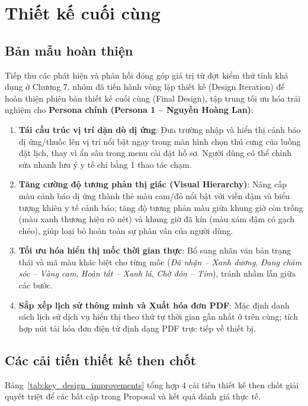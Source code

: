 \section{Thiết kế cuối cùng}

\subsection{Bản mẫu hoàn thiện}
Tiếp thu các phát hiện và phản hồi đóng góp giá trị từ đợt kiểm thử tính khả dụng ở Chương 7, nhóm đã tiến hành vòng lặp thiết kế (Design Iteration) để hoàn thiện phiên bản thiết kế cuối cùng (Final Design), tập trung tối ưu hóa trải nghiệm cho \textbf{Persona chính (Persona 1 -- Nguyễn Hoàng Lan)}:
\begin{enumerate}
    \item \textbf{Tái cấu trúc vị trí dặn dò dị ứng}: Đưa trường nhập và hiển thị cảnh báo dị ứng/thuốc lên vị trí nổi bật ngay trong màn hình chọn thú cưng của luồng đặt lịch, thay vì ẩn sâu trong menu cài đặt hồ sơ. Người dùng có thể chỉnh sửa nhanh lưu ý y tế chỉ bằng 1 thao tác chạm.
    \item \textbf{Tăng cường độ tương phản thị giác (Visual Hierarchy)}: Nâng cấp màu cảnh báo dị ứng thành thẻ màu cam/đỏ nổi bật với viền đậm và biểu tượng khiên y tế cảnh báo; tăng độ tương phản màu giữa khung giờ còn trống (màu xanh thương hiệu rõ nét) và khung giờ đã kín (màu xám đậm có gạch chéo), giúp loại bỏ hoàn toàn sự phân vân của người dùng.
    \item \textbf{Tối ưu hóa hiển thị mốc thời gian thực}: Bổ sung nhãn văn bản trạng thái và mã màu khác biệt cho từng mốc (\textit{Đã nhận -- Xanh dương}, \textit{Đang chăm sóc -- Vàng cam}, \textit{Hoàn tất -- Xanh lá}, \textit{Chờ đón -- Tím}), tránh nhầm lẫn giữa các bước.
    \item \textbf{Sắp xếp lịch sử thông minh và Xuất hóa đơn PDF}: Mặc định danh sách lịch sử dịch vụ hiển thị theo thứ tự thời gian gần nhất ở trên cùng; tích hợp nút tải hóa đơn điện tử định dạng PDF trực tiếp về thiết bị.
\end{enumerate}

\subsection{Các cải tiến thiết kế then chốt}
Bảng~\ref{tab:key_design_improvements} tổng hợp 4 cải tiến thiết kế then chốt giải quyết triệt để các bất cập trong Proposal và kết quả đánh giá thực tế.

